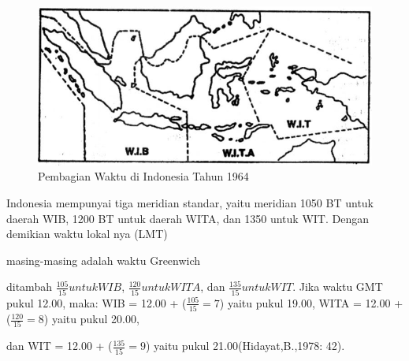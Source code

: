  
 \begin{figure}[ht]
 \centerline{\includegraphics[width=1\textwidth]{figures/sejarahwaktu_indo64}}
 \caption{Pembagian Waktu di Indonesia Tahun 1964}
 \label{sejarahwaktu_Capture2}
 \end{figure}
 


Indonesia mempunyai tiga meridian standar, yaitu meridian 1050 BT untuk daerah WIB, 
 1200 BT untuk daerah WITA, dan 1350 untuk WIT. Dengan demikian waktu lokal nya (LMT) 

 masing-masing adalah waktu Greenwich 

 ditambah $\frac{105}{15} untuk WIB$, $\frac{120}{15} untuk WITA$, dan $\frac{135}{15} untuk WIT$.
 Jika waktu GMT pukul 12.00, maka: WIB = 12.00 + ($\frac{105}{15}=7$) yaitu pukul 19.00,
 WITA = 12.00 + ($\frac{120}{15}= 8$) yaitu pukul 20.00, 


 dan WIT = 12.00 + ($\frac{135}{15}=9$) yaitu pukul 21.00(Hidayat,B.,1978: 42).

